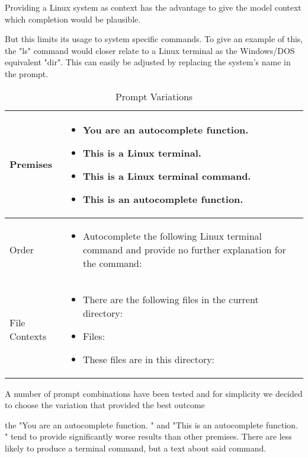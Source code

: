 Providing a Linux system as context has the advantage to give the model context which completion would be plausible. 

But this limits its usage to system specific commands. To give an example of this, the "ls" command would closer relate to  a Linux terminal as the Windows/DOS equivalent "dir". This can easily be adjusted by replacing the system's name in the prompt.



  



\begin{table}[htbp]
    \centering
    \caption{Prompt Variations}
    \begin{tabular}{|p{5cm}|p{8cm}|}
        \hline
        Premises & 
        \begin{itemize}
            \item You are an autocomplete function.
            \item This is a Linux terminal.
            \item This is a Linux terminal command.
            \item This is an autocomplete function.
        \end{itemize}
        \\
        \hline
        Order & 
        \begin{itemize}
            \item Autocomplete the following Linux terminal command and provide no further explanation for the command:
        \end{itemize}
        \\
        \hline
        File Contexts & 
        \begin{itemize}
            \item There are the following files in the current directory:
            \item Files:
            \item These files are in this directory:
        \end{itemize}
        \\
        \hline
    \end{tabular}
\end{table}


 

A number of prompt combinations have been tested and for simplicity we decided to choose the variation that provided the best outcome 


the "You are an autocomplete function. " and "This is an autocomplete function. " tend to provide significantly worse results than other premises. There are less likely to produce a terminal command, but a text about said command.

